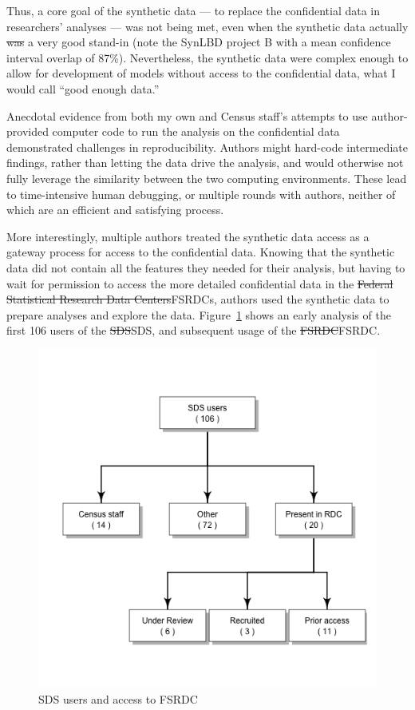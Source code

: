 \documentclass[inline]{hdsr} %
\providecommand{\DIFadd}[1]{{\protect\color{blue}\uwave{#1}}} %
\providecommand{\DIFdel}[1]{{\protect\color{red}\sout{#1}}}                      %
\providecommand{\DIFaddbegin}{} %
\providecommand{\DIFaddend}{} %
\providecommand{\DIFdelbegin}{} %
\providecommand{\DIFdelend}{} %
\providecommand{\DIFaddbeginFL}{} %
\providecommand{\DIFaddendFL}{} %
\providecommand{\DIFdelbeginFL}{} %
\providecommand{\DIFdelendFL}{} %
\begin{document}
\DIFdelend Thus, a core goal of the synthetic data --- to replace the confidential data in researchers' analyses --- was not being met, even when the synthetic data actually \DIFdelbegin \DIFdel{was }\DIFdelend \DIFaddbegin \DIFadd{w }\DIFaddend a very good stand-in (note the SynLBD project B with a mean confidence interval overlap of 87\%). Nevertheless, the synthetic data were complex enough to allow for development of models without access to the confidential data, what I would call ``good enough data.''

Anecdotal evidence from both my own and Census staff's attempts to use author-provided computer code to run the analysis on the confidential data demonstrated challenges in reproducibility. Authors might hard-code intermediate findings, rather than letting the data drive the analysis, and would otherwise not fully leverage the similarity between the two computing environments. These lead to time-intensive human debugging, or multiple rounds with authors, neither of which are an efficient and satisfying process. 

More interestingly, multiple authors treated the synthetic data access as a gateway process for access to the confidential data. Knowing that the synthetic data did not contain all the features they needed for their analysis, but having to wait for permission to access the more detailed confidential data in the \DIFdelbegin \DIFdel{Federal Statistical Research Data Centers}\DIFdelend \DIFaddbegin \acp{FSRDC}\DIFaddend , authors used the synthetic data to prepare analyses and explore the data. Figure~\ref{fig:useRDC} shows an early analysis of the first 106 users of the \DIFdelbegin \DIFdel{SDS}\DIFdelend \DIFaddbegin \ac{SDS}\DIFaddend , and subsequent usage of the \DIFdelbegin \DIFdel{FSRDC}\DIFdelend \DIFaddbegin \ac{FSRDC}\DIFaddend . 

\begin{figure}
    \centering
    \DIFdelbeginFL %
\DIFdelendFL \DIFaddbeginFL \includegraphics[width=0.5\linewidth]{useRDCgraph.png}
    \DIFaddendFL \caption{SDS users and access to FSRDC}
    \label{fig:useRDC}
\end{figure}
\end{document}
